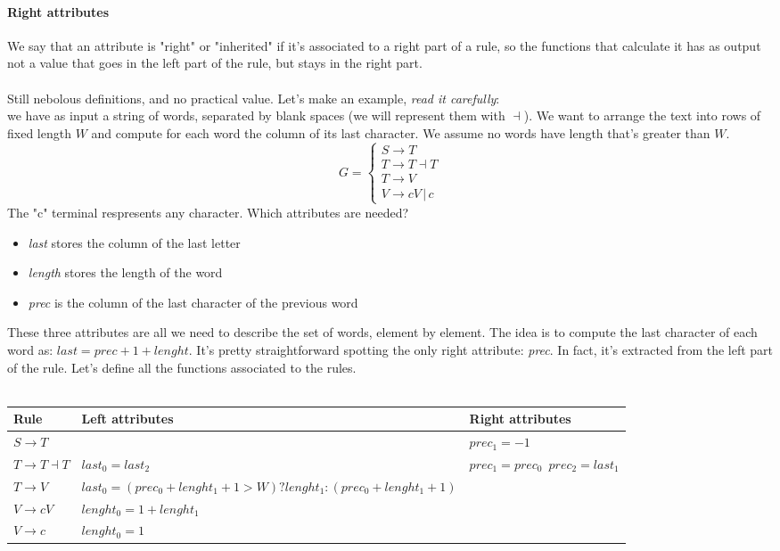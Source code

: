 				\paragraph{Right attributes}
					We say that an attribute is "right" or "inherited" if it's associated to a right part of a rule, so the functions that calculate it has as output not a value that goes in the left part of the rule, but stays in the right part.  
				\\\\Still nebolous definitions, and no practical value. Let's make an example, \emph{read it carefully}:\\
				we have as input a string of words, separated by blank spaces (we will represent them with $\dashv$). We want to arrange the text into rows of fixed length $W$ and compute for each word the column of its last character. We assume no words have length that's greater than $W$. 
				\begin{equation}
					G = 
					\begin{cases}
						S \rightarrow T \\
						T \rightarrow T \dashv T \\
						T \rightarrow V \\
						V \rightarrow cV \,\vert\, c
					\end{cases}
				\end{equation}
				The "c" terminal respresents any character. Which attributes are needed?
				\begin{itemize}
					\item \emph{last} stores the column of the last letter
					\item \emph{length} stores the length of the word
					\item \emph{prec} is the column of the last character of the previous word
				\end{itemize}
				These three attributes are all we need to describe the set of words, element by element. The idea is to compute the last character of each word as: $last = prec + 1 + lenght$. It's pretty straightforward spotting the only right attribute: \emph{prec}. In fact, it's extracted from the left part of the rule. Let's define all the functions associated to the rules.\\\\
				\begin{center}
					\begin{tabular}{| m{3cm} || m{3cm} | m{3cm} | }
						Rule & Left attributes & Right attributes \\
						\hline
						$S \rightarrow T$ & & $prec_1 = -1$\\
						\hline
						$T \rightarrow T \dashv T$ & $last_0 = last_2$ & $prec_1 = prec_0\,\,\,prec_2 = last_1$ \\
						\hline
						$T \rightarrow V $ & $last_0 = (prec_0 + lenght_1 + 1 > W) ? lenght_1 : (prec_0 + lenght_1 + 1)$ &\\
						\hline
						$V \rightarrow cV$ & $lenght_0 = 1 + lenght_1$ & \\
						\hline
						$V \rightarrow c$ & $lenght_0 = 1$ &  
					\end{tabular}
				\end{center}
